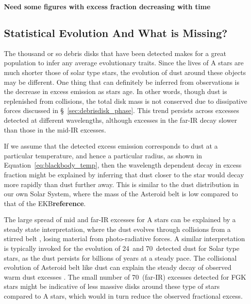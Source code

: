    \textbf{Need some figures with excess fraction decreasing with time}
   
    
\subsection{Statistical Evolution And What is Missing?}
    
    The thousand or so debris disks that have been detected makes for a great population to infer any average evolutionary traits. Since the lives of A stars are much shorter those of solar type stars, the evolution of dust around these objects may be different. One thing that can definitely be inferred from observations is the decrease in excess emission as stars age. In other words, though dust is replenished from collisions, the total disk mass is not conserved due to dissipative forces discussed in \S~\ref{sec:debrisdisk_phase}. This trend persists across excesses detected at different wavelengths, although excesses in the far-IR decay slower than those in the mid-IR excesses. 
    
    If we assume that the detected excess emission corresponds to dust at a particular temperature, and hence a particular radius, as shown in Equation~\ref{eq:blackbody_temp}, then the wavelength dependent decay in excess fraction might be explained by inferring that dust closer to the star would decay more rapidly than dust further away. This is similar to the dust distribution in our own Solar System, where the mass of the Asteroid belt is low compared to that of the EKB\textbf{reference}. 
    
    The large spread of mid and far-IR excesses for A stars can be explained by a steady state interpretation, where the dust evolves through collisions from a stirred belt \citep{Su2006, Wyatt2008}, losing material from photo-radiative forces. A similar interpretation is typically invoked for the evolution of 24\micron\ and 70\micron\ detected dust for Solar type stars, as the dust persists for billions of years at a steady pace. The collisional evolution of Asteroid belt like dust can explain the steady decay of observed warm dust excesses \citep{Wyatt2008}. The small number of 70\micron\ (far-IR) excesses detected for FGK stars might be indicative of less massive disks around these type of stars compared to A stars, which would in turn reduce the observed fractional excess\citep{Wyatt2008}. 
    
